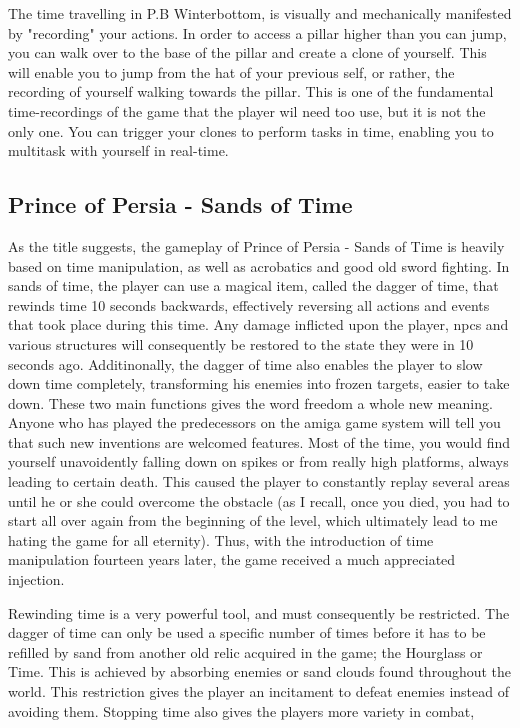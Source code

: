 The time travelling in P.B Winterbottom, is visually and mechanically manifested by "recording" your actions. In order to access a pillar higher than you can jump, 
you can walk over to the base of the pillar and create a clone of yourself. This will enable you to jump from the hat of your previous self, or rather, the recording of 
yourself walking towards the pillar. This is one of the fundamental time-recordings of the game that the player wil need too use, but it is not the only one. You can trigger your clones to perform tasks in time, enabling you to multitask with yourself in real-time.


\subsection{Prince of Persia - Sands of Time}
As the title suggests, the gameplay of Prince of Persia - Sands of Time is heavily based on time manipulation, as well as acrobatics and good old sword fighting. 
In sands of time, the player can use a magical item, called the dagger of time, that rewinds time 10 seconds backwards, effectively reversing all actions and events 
that took place during this time. Any damage inflicted upon the player, npcs and various structures will consequently be restored to the state they were in 10 seconds ago.
 Additinonally, the dagger of time also enables the player to slow down time completely, transforming his enemies into frozen targets, easier to take down. These two main 
functions gives the word freedom a whole new meaning. Anyone who has played the predecessors on the amiga game system will tell you that such new inventions are 
welcomed features. Most of the time, you would find yourself unavoidently falling down on spikes or from really high platforms, always leading to certain death. 
This caused the player to constantly replay several areas until he or she could overcome the obstacle (as I recall, once you died, you had to start all over again from the
 beginning of the level, which ultimately lead to me hating the game for all eternity). Thus, with the introduction of time manipulation fourteen years later, the game received a much appreciated injection. 

Rewinding time is a very powerful tool, and must consequently be restricted. The dagger of time can only be used a specific number of times before it 
has to be refilled by sand from another old relic acquired in the game; the Hourglass or Time. This is achieved by absorbing enemies or sand clouds found 
throughout the world. This restriction gives the player an incitament to defeat enemies instead of avoiding them. Stopping time also gives the players more variety in combat, 

